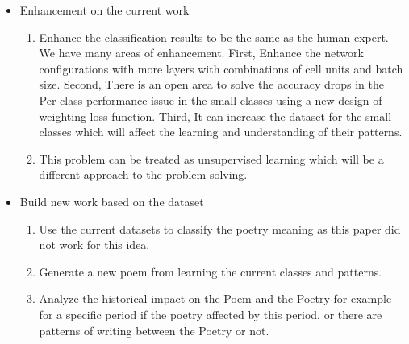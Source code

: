 \begin{itemize}
\item Enhancement on the current work
  \begin{enumerate}
  \item Enhance the classification results to be the same as the human expert. We have many areas of enhancement. First, Enhance the network configurations with more layers with combinations of cell units and batch size. Second, There is an open area to solve the accuracy drops in the Per-class performance issue in the small classes using a new design of weighting loss function. Third, It can increase the dataset for the small classes which will affect the learning and understanding of their patterns.
  \item This problem can be treated as unsupervised learning which will be a different approach to the problem-solving.
  \end{enumerate}
\item Build new work based on the dataset
  \begin{enumerate}
  \item Use the current datasets to classify the poetry meaning as this paper did not work for this idea.
  \item Generate a new poem from learning the current classes and patterns.
    \item Analyze the historical impact on the Poem and the Poetry for example for a specific period if the poetry affected by this period, or there are patterns of writing between the Poetry or not.
\end{enumerate}
  
\end{itemize}



